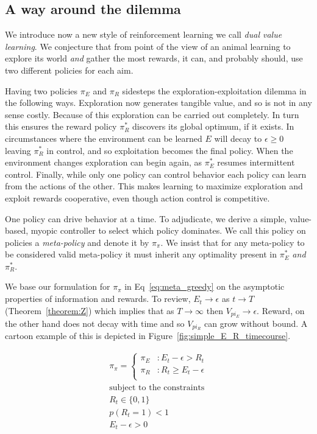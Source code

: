 \documentclass[9pt,twocolumn,twoside]{pnas-new}
\begin{document}
\subsection*{A way around the dilemma}
We introduce now a new style of reinforcement learning we call \textit{dual value learning}. We conjecture that from point of the view of an animal learning to explore its world \textit{and} gather the most rewards, it can, and probably should, use two different policies for each aim. 

Having two policies $\pi_E$ and $\pi_R$ sidesteps the exploration-exploitation dilemma in the following ways. Exploration now generates tangible value, and so is not in any sense costly. Because of this exploration can be carried out completely. In turn this ensures the reward policy $\pi^*_R$ discovers its global optimum, if it exists. In circumstances where the environment can be learned $E$ will decay to $\epsilon \geq 0$ leaving $\pi^*_R$ in control, and so exploitation becomes the final policy. When the environment changes exploration can begin again, as $\pi^*_E$ resumes intermittent control. Finally, while only one policy can control behavior each policy can learn from the actions of the other. This makes learning to maximize exploration and exploit rewards cooperative, even though action control is competitive. 

One policy can drive behavior at a time. To adjudicate, we derive a simple, value-based, myopic controller \cite{Hocker2017} to select which policy dominates. We call this policy on policies a \textit{meta-policy} and denote it by $\pi_{\pi}$. We insist that for any meta-policy to be considered valid meta-policy it must inherit any optimality present in $\pi^*_E$ \textit{and} $\pi^*_R$.

We base our formulation for $\pi_{\pi}$ in Eq~\ref{eq:meta_greedy} on the asymptotic properties of information and rewards. To review, $E_t \rightarrow \epsilon$ as $t \rightarrow T$ (Theorem~\ref{theorem:Z}) which implies that as $T \rightarrow \infty$ then $V_{pi_E} \rightarrow \epsilon$. Reward, on the other hand does not decay with time and so $V_{pi_R}$ can grow without bound. A cartoon example of this is depicted in Figure~\ref{fig:simple_E_R_timecourse}.

\begin{equation} \label{eq:meta_greedy}
    \begin{split}
        \pi_{\pi} = 
        \begin{cases}
            \pi_E & : E_t - \epsilon > R_t \\
            \pi_R & : R_t \geq E_t - \epsilon \\
        \end{cases}\\
        \text{subject to the constraints}\\
        R_t \in \{0, 1\}\\ 
        p(R_t = 1) < 1\\
        E_t - \epsilon > 0
    \end{split}
\end{equation}
\end{document}
